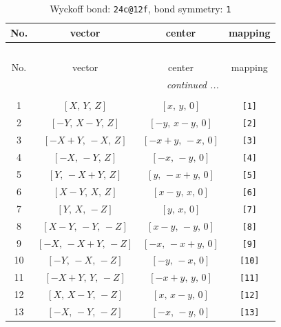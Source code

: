 \documentclass[fleqn,8pt]{jsarticle}
\begin{document}
\begin{longtable}{cccc}
\caption{Wyckoff bond: {\tt 24c@12f}, bond symmetry: {\tt 1}}
 \\
 \hline \hline
No. & vector & center & mapping \\ \hline \endfirsthead

\multicolumn{3}{l}{\tablename\ \thetable{}} \\
 \hline \hline
No. & vector & center & mapping \\ \hline \endhead

 \hline \hline
\multicolumn{3}{r}{\footnotesize\it continued ...} \\ \endfoot

 \hline \hline
\multicolumn{3}{r}{} \\ \endlastfoot

1 & $\left[ X,\, Y,\, Z \right]$ & $\left[ x,\, y,\, 0 \right]$ & {\tt [1]} \\ \hline
2 & $\left[ - Y,\, X - Y,\, Z \right]$ & $\left[ - y,\, x - y,\, 0 \right]$ & {\tt [2]} \\ \hline
3 & $\left[ - X + Y,\, - X,\, Z \right]$ & $\left[ - x + y,\, - x,\, 0 \right]$ & {\tt [3]} \\ \hline
4 & $\left[ - X,\, - Y,\, Z \right]$ & $\left[ - x,\, - y,\, 0 \right]$ & {\tt [4]} \\ \hline
5 & $\left[ Y,\, - X + Y,\, Z \right]$ & $\left[ y,\, - x + y,\, 0 \right]$ & {\tt [5]} \\ \hline
6 & $\left[ X - Y,\, X,\, Z \right]$ & $\left[ x - y,\, x,\, 0 \right]$ & {\tt [6]} \\ \hline
7 & $\left[ Y,\, X,\, - Z \right]$ & $\left[ y,\, x,\, 0 \right]$ & {\tt [7]} \\ \hline
8 & $\left[ X - Y,\, - Y,\, - Z \right]$ & $\left[ x - y,\, - y,\, 0 \right]$ & {\tt [8]} \\ \hline
9 & $\left[ - X,\, - X + Y,\, - Z \right]$ & $\left[ - x,\, - x + y,\, 0 \right]$ & {\tt [9]} \\ \hline
10 & $\left[ - Y,\, - X,\, - Z \right]$ & $\left[ - y,\, - x,\, 0 \right]$ & {\tt [10]} \\ \hline
11 & $\left[ - X + Y,\, Y,\, - Z \right]$ & $\left[ - x + y,\, y,\, 0 \right]$ & {\tt [11]} \\ \hline
12 & $\left[ X,\, X - Y,\, - Z \right]$ & $\left[ x,\, x - y,\, 0 \right]$ & {\tt [12]} \\ \hline
13 & $\left[ - X,\, - Y,\, - Z \right]$ & $\left[ - x,\, - y,\, 0 \right]$ & {\tt [13]} \\ \hline

\end{longtable}
\end{document}

